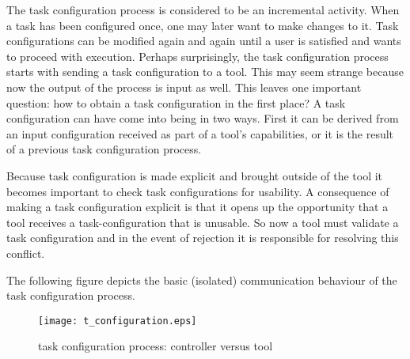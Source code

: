 \documentclass{article}
\begin{document}
   The task configuration process is considered to be an incremental activity.
   When a task has been configured once, one may later want to make changes to
   it.  Task configurations can be modified again and again until a user is
   satisfied and wants to proceed with execution. Perhaps surprisingly, the
   task configuration process starts with sending a task configuration to a
   tool. This may seem strange because now the output of the process is input
   as well. This leaves one important question: how to obtain a task configuration
   in the first place?  A task configuration can have come into being in two
   ways.  First it can be derived from an input configuration received as part
   of a tool's capabilities, or it is the result of a previous task
   configuration process.
   
   Because task configuration is made explicit and brought outside of the tool
   it becomes important to check task configurations for usability. A
   consequence of making a task configuration explicit is that it opens up the
   opportunity that a tool receives a task-configuration that is unusable. So
   now a tool must validate a task configuration and in the event of rejection
   it is responsible for resolving this conflict.

   The following figure depicts the basic (isolated) communication behaviour of
   the task configuration process.
   
   \begin{figure}[H]
    \begin{center}
     \texttt{[image: t\_configuration.eps]}
    \end{center}
    \vspace{-0.3cm}
    \caption{task configuration process: controller versus tool}
   \end{figure}
\end{document}

